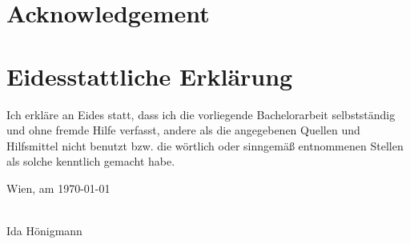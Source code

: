 \documentclass[a4paper,11pt,bibliography=totoc,listof=totoc,headinclude=true,cleardoublepage=empty]{scrbook}
\begin{document}
\cleardoublepage

\chapter*{Acknowledgement}
\thispagestyle{empty}

\cleardoublepage

\chapter*{Eidesstattliche Erkl\"arung}
\thispagestyle{empty}
\thispagestyle{empty}

\vspace*{2cm}

Ich erkl\"are an Eides statt, dass ich die vorliegende Bachelorarbeit selbstst\"andig und ohne fremde Hilfe verfasst, andere als die angegebenen Quellen und Hilfsmittel nicht benutzt bzw. die w\"ortlich oder sinngem\"a{\ss} entnommenen Stellen als solche kenntlich gemacht habe.

\vspace*{3cm}

\noindent
Wien, am \today
%
\hfill 
%
\begin{minipage}[t]{5cm}
\centering
\underline{\hspace*{5cm}}\\
\small Ida Hönigmann
\end{minipage}

\cleardoublepage


\tableofcontents

\cleardoublepage
{} 











\printbibliography
\end{document}
